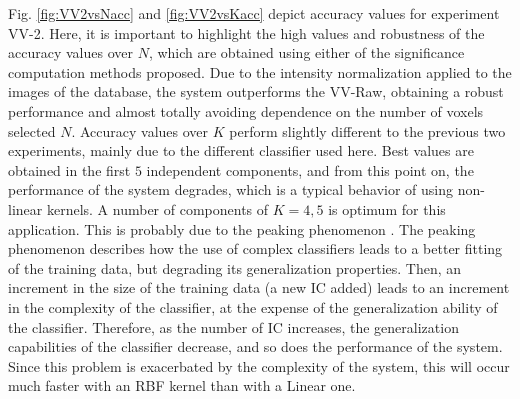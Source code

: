 	Fig. \ref{fig:VV2vsNacc} and \ref{fig:VV2vsKacc} depict accuracy values for experiment VV-2. Here, it is important to highlight the high values and robustness of the accuracy values over $N$, which are obtained using either of the significance computation methods proposed. Due to the intensity normalization applied to the images of the database, the system outperforms the VV-Raw, obtaining a robust performance and almost totally avoiding dependence on the number of voxels selected $N$. Accuracy values over $K$ perform slightly different to the previous two experiments, mainly due to the different classifier used here. Best values are obtained in the first $5$ independent components, and from this point on, the performance of the system degrades, which is a typical behavior of using non-linear kernels. A number of components of $K=4,5$ is optimum for this application. This is probably due to the peaking phenomenon \cite{Krishnaiah1982}. The peaking phenomenon describes how the use of complex classifiers leads to a better fitting of the training data, but degrading its generalization properties. Then, an increment in the size of the training data (a new IC added) leads to an increment in the complexity of the classifier, at the expense of the generalization ability of the classifier. Therefore, as the number of IC increases, the generalization capabilities of the classifier decrease, and so does the performance of the system. Since this problem is exacerbated by the complexity of the system, this will occur much faster with an RBF kernel than with a Linear one.
	
	
	
